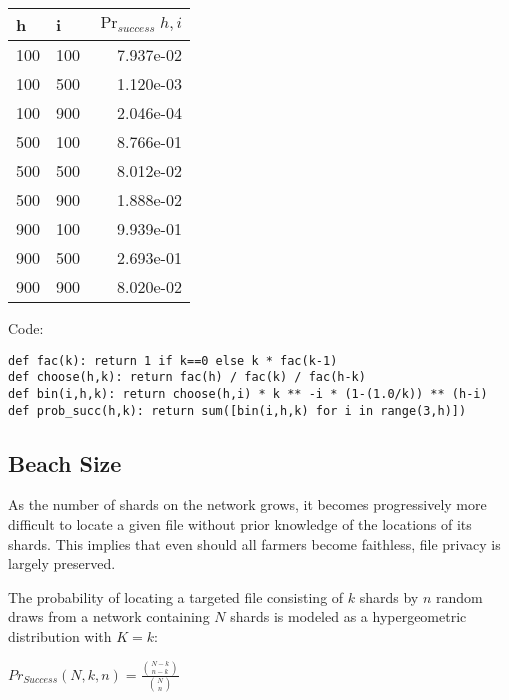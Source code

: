 \documentclass[a4paper,10pt]{article}
\begin{document}
\begin{table}[hbt!]
\begin{center}
\begin{tabular}{l l r}
h & i & $\Pr_{success}{h,i}$\\
\hline  100 & 100 & 7.937e-02\\
\hline  100 & 500 & 1.120e-03\\
\hline  100 & 900 & 2.046e-04\\
\hline  500 & 100 & 8.766e-01\\
\hline  500 & 500 & 8.012e-02\\
\hline  500 & 900 & 1.888e-02\\
\hline  900 & 100 & 9.939e-01\\
\hline  900 & 500 & 2.693e-01\\
\hline  900 & 900 & 8.020e-02\\
\end{tabular}
\end{center}
\end{table}

Code:
\begin{lstlisting}
def fac(k): return 1 if k==0 else k * fac(k-1)
def choose(h,k): return fac(h) / fac(k) / fac(h-k)
def bin(i,h,k): return choose(h,i) * k ** -i * (1-(1.0/k)) ** (h-i)
def prob_succ(h,k): return sum([bin(i,h,k) for i in range(3,h)])
\end{lstlisting}

\subsection{Beach Size}

As the number of shards on the network grows, it becomes progressively more
difficult to locate a given file without prior knowledge of the locations of its
shards. This implies that even should all farmers become faithless, file privacy
is largely preserved.

The probability of locating a targeted file consisting of $ k $ shards by $ n $
random draws from a network containing $ N $ shards is modeled as a
hypergeometric distribution with $ K = k $:

{\centering
$Pr_{Success}(N,k,n) = \displaystyle \frac{{N-k \choose n-k}}{{N \choose n}}$
\\}
\end{document}
